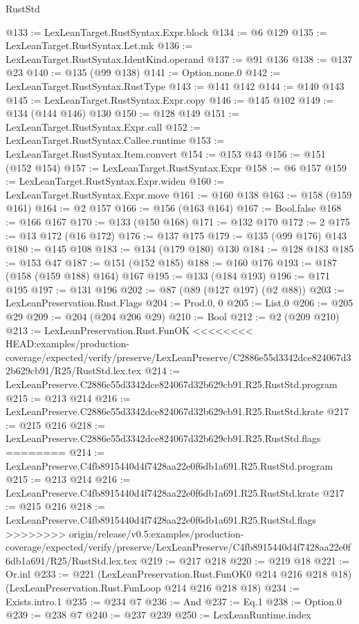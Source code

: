 \begin{lexlean}{RustStd}
\begin{coremodule}
{\begin{coremodule}
{{{{{@133 := LexLeanTarget.RustSyntax.Expr.block
@134 := @6 @129
@135 := LexLeanTarget.RustSyntax.Let.mk
@136 := LexLeanTarget.RustSyntax.IdentKind.operand
@137 := @91 @136
@138 := @137 @23
@140 := @135 (@99 @138)
@141 := Option.none.{0}
@142 := LexLeanTarget.RustSyntax.RustType
@143 := @141 @142
@144 := @140 @143
@145 := LexLeanTarget.RustSyntax.Expr.copy
@146 := @145 @102
@149 := @134 (@144 @146) @130
@150 := @128 @149
@151 := LexLeanTarget.RustSyntax.Expr.call
@152 := LexLeanTarget.RustSyntax.Callee.runtime
@153 := LexLeanTarget.RustSyntax.Item.convert
@154 := @153 @43
@156 := @151 (@152 @154)
@157 := LexLeanTarget.RustSyntax.Expr
@158 := @6 @157
@159 := LexLeanTarget.RustSyntax.Expr.widen
@160 := LexLeanTarget.RustSyntax.Expr.move
@161 := @160 @138
@163 := @158 (@159 @161)
@164 := @2 @157
@166 := @156 (@163 @164)
@167 := Bool.false
@168 := @166 @167
@170 := @133 (@150 @168)
@171 := @132 @170
@172 := 2
@175 := @13 @172 (@16 @172)
@176 := @137 @175
@179 := @135 (@99 @176) @143
@180 := @145 @108
@183 := @134 (@179 @180) @130
@184 := @128 @183
@185 := @153 @47
@187 := @151 (@152 @185)
@188 := @160 @176
@193 := @187 (@158 (@159 @188) @164) @167
@195 := @133 (@184 @193)
@196 := @171 @195
@197 := @131 @196
@202 := @87 (@89 (@127 @197) (@2 @88))
@203 := LexLeanPreservation.Rust.Flags
@204 := Prod.{0, 0}
@205 := List.{0}
@206 := @205 @29
@209 := @204 (@204 @206 @29)
@210 := Bool
@212 := @2 (@209 @210)
@213 := LexLeanPreservation.Rust.FunOK
<<<<<<<< HEAD:examples/production-coverage/expected/verify/preserve/LexLeanPreserve/C2886e55d3342dce824067d32b629cb91/R25/RustStd.lex.tex
@214 := LexLeanPreserve.C2886e55d3342dce824067d32b629cb91.R25.RustStd.program
@215 := @213 @214
@216 := LexLeanPreserve.C2886e55d3342dce824067d32b629cb91.R25.RustStd.krate
@217 := @215 @216
@218 := LexLeanPreserve.C2886e55d3342dce824067d32b629cb91.R25.RustStd.flags
========
@214 := LexLeanPreserve.C4fb8915440d4f7428aa22e0f6db1a691.R25.RustStd.program
@215 := @213 @214
@216 := LexLeanPreserve.C4fb8915440d4f7428aa22e0f6db1a691.R25.RustStd.krate
@217 := @215 @216
@218 := LexLeanPreserve.C4fb8915440d4f7428aa22e0f6db1a691.R25.RustStd.flags
>>>>>>>> origin/release/v0.5:examples/production-coverage/expected/verify/preserve/LexLeanPreserve/C4fb8915440d4f7428aa22e0f6db1a691/R25/RustStd.lex.tex
@219 := @217 @218
@220 := @219 @18
@221 := Or.inl
@233 := @221
    (LexLeanPreservation.Rust.FunOK0 @214 @216 @218 @18)
    (LexLeanPreservation.Rust.FunLoop @214 @216 @218 @18)
@234 := Exists.intro.{1}
@235 := @234 @7
@236 := And
@237 := Eq.{1}
@238 := Option.{0}
@239 := @238 @7
@240 := @237 @239
@250 := LexLeanRuntime.index
}}}}}
\end{coremodule}}
\end{coremodule}
\end{lexlean}
